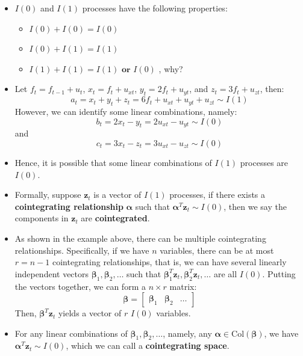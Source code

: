 \documentclass[notitlepage]{article}
\begin{document}
\begin{itemize}
    \item \(I(0)\) and \(I(1)\) processes have the following properties:
    \begin{itemize}
        \item \(I(0)+I(0)=I(0)\) 
        \item \(I(0)+I(1)=I(1)\) 
        \item \(I(1)+I(1)=I(1) \textbf{ or } I(0)\) , why?
    \end{itemize}
    \item Let \(f_t = f_{t-1} + u_t\), \(x_t = f_t + u_{xt}\), \(y_t = 2f_t + u_{yt}\), and \(z_t = 3f_t + u_{zt}\), then:
    \[
    a_t = x_t + y_t + z_t = 6f_t + u_{xt} + u_{yt} + u_{zt} \sim I(1)
    \]
    However, we can identify some linear combinations, namely:
    \[
    b_t = 2x_t - y_t = 2u_{xt} - u_{yt} \sim I(0)
    \]
    and
    \[
    c_t = 3x_t - z_t = 3u_{xt} - u_{zt} \sim I(0)
    \]
    \item Hence, it is possible that some linear combinations of \(I(1)\) processes are \(I(0)\). 
    
    \item Formally, suppose \(\mathbf{z}_t\) is a vector of \(I(1)\) processes, if there exists a \textbf{cointegrating relationship} \(\boldsymbol{\alpha}\) such that \(\boldsymbol{\alpha}^T\mathbf{z}_t \sim I(0)\), then we say the components in \(\mathbf{z}_t\) are \textbf{cointegrated}. 

    \item As shown in the example above, there can be multiple cointegrating relationships. Specifically, if we have \(n\) variables, there can be at most \(r=n-1\) cointegrating relationships, that is, we can have several linearly independent vectors \(\boldsymbol\beta_1, \boldsymbol\beta_2, \dots\) such that \(\boldsymbol\beta_1^T\mathbf{z}_t, \boldsymbol\beta_2^T\mathbf{z}_t, \dots\) are all \(I(0)\). Putting the vectors together, we can form a \(n \times r\) matrix:
    \[
    \boldsymbol{\beta} = \begin{bmatrix} \boldsymbol\beta_1 & \boldsymbol\beta_2 & \dots\end{bmatrix}
    \]
    Then, \(\boldsymbol{\beta}^T\mathbf{z}_t\) yields a vector of \(r\) \(I(0)\) variables.

    \item For any linear combinations of \(\boldsymbol\beta_1, \boldsymbol\beta_2, \dots\), namely, any \(\boldsymbol{\alpha} \in \text{Col}(\boldsymbol\beta)\), we have \(\boldsymbol{\alpha}^T \mathbf{z}_t \sim I(0)\), which we can call a \textbf{cointegrating space}.


\end{itemize}
\end{document}
